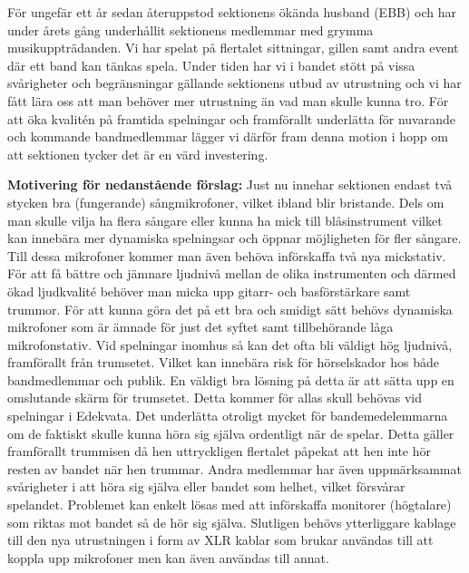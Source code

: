 \documentclass[../_main/handlingar.tex]{subfiles}
\begin{document}

För ungefär ett år sedan återuppstod sektionens ökända husband (EBB) och har under årets gång underhållit sektionens medlemmar med grymma musikuppträdanden. Vi har spelat på flertalet sittningar, gillen samt andra event där ett band kan tänkas spela. Under tiden har vi i bandet stött på vissa svårigheter och begränsningar gällande sektionens utbud av utrustning och vi har fått lära oss att man behöver mer utrustning än vad man skulle kunna tro. För att öka kvalitén på framtida spelningar och framförallt underlätta för nuvarande och kommande bandmedlemmar lägger vi därför fram denna motion i hopp om att sektionen tycker det är en värd investering.

\textbf{Motivering för nedanstående förslag:} \newline
Just nu innehar sektionen endast två stycken bra (fungerande) sångmikrofoner, vilket ibland blir bristande. Dels om man skulle vilja ha flera sångare eller kunna ha mick till blåsinstrument vilket kan innebära mer dynamiska spelningsar och öppnar möjligheten för fler sångare. Till dessa mikrofoner kommer man även behöva införskaffa två nya mickstativ. \newline
För att få bättre och jämnare ljudnivå mellan de olika instrumenten och därmed ökad ljudkvalité behöver man micka upp gitarr- och basförstärkare samt trummor. För att kunna göra det på ett bra och smidigt sätt behövs dynamiska mikrofoner som är ämnade för just det syftet samt tillbehörande låga mikrofonstativ. \newline
Vid spelningar inomhus så kan det ofta bli väldigt hög ljudnivå, framförallt från trumsetet. Vilket kan innebära risk för hörselskador hos både bandmedlemmar och publik. En väldigt bra lösning på detta är att sätta upp en omslutande skärm för trumsetet. Detta kommer för allas skull behövas vid spelningar i Edekvata. \newline
Det underlätta otroligt mycket för bandemedelemmarna om de faktiskt skulle kunna höra sig själva ordentligt när de spelar. Detta gäller framförallt trummisen då hen uttryckligen flertalet påpekat att hen inte hör resten av bandet när hen trummar. Andra medlemmar har även uppmärksammat svårigheter i att höra sig själva eller bandet som helhet, vilket försvårar spelandet. Problemet kan enkelt lösas med att införskaffa monitorer (högtalare) som riktas mot bandet så de hör sig själva.
Slutligen behövs ytterliggare kablage till den nya utrustningen i form av XLR kablar som brukar användas till att koppla upp mikrofoner men kan även användas till annat.
\end{document}
